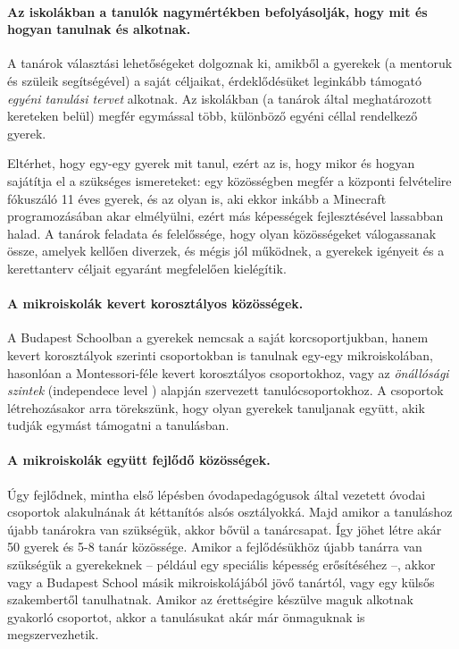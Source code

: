 \paragraph{Az iskolákban a tanulók nagymértékben befolyásolják, hogy mit és
  hogyan tanulnak és alkotnak.}

A tanárok választási lehetőségeket dolgoznak ki, amikből a gyerekek (a
mentoruk és szüleik segítségével) a saját céljaikat, érdeklődésüket
leginkább
támogató \emph{egyéni tanulási tervet} alkotnak. Az iskolákban (a tanárok
által
meghatározott kereteken belül) megfér egymással több, különböző egyéni
céllal
rendelkező gyerek.

Eltérhet, hogy egy-egy gyerek mit tanul, ezért az is, hogy mikor és hogyan
sajátítja el a szükséges ismereteket: egy közösségben megfér a központi
felvételire fókuszáló 11 éves gyerek, és az olyan is, aki ekkor inkább a
Mine\-craft programozásában akar elmélyülni, ezért más képességek
fejlesztésével
lassabban halad. A tanárok feladata és felelőssége, hogy olyan közösségeket
válogassanak össze, amelyek kellően diverzek, és mégis jól működnek, a
gyerekek
igényeit és a kerettanterv céljait egyaránt megfelelően kielégítik.

\paragraph{A mikroiskolák kevert korosztályos közösségek.}

A Budapest Schoolban a gyerekek nemcsak a saját korcsoportjukban, hanem
kevert korosztályok szerinti csoportokban is tanulnak egy-egy mikroiskolában,
hasonlóan a Montessori-féle kevert korosztályos csoportokhoz, vagy az
\emph{önállósági szintek} (independece level  \citep{indepence_level}) alapján
szervezett tanulócsoportokhoz. A csoportok létrehozásakor arra törekszünk, hogy
olyan gyerekek tanuljanak együtt, akik tudják egymást támogatni a tanulásban.

\paragraph{A mikroiskolák együtt fejlődő közösségek.}

Úgy fejlődnek, mintha első lépésben óvodapedagógusok által vezetett óvodai
csoportok
alakulnának át kéttanítós alsós osztályokká. Majd amikor a tanuláshoz újabb
tanárokra van szükségük, akkor bővül a tanárcsapat. Így jöhet létre akár 50
gyerek és 5-8
tanár közössége. Amikor a fejlődésükhöz újabb tanárra van szükségük a
gyerekeknek -- például egy speciális képesség erősítéséhez --, akkor vagy a
Budapest School másik mikroiskolájából jövő tanártól, vagy egy külsős
szakembertől
tanulhatnak. Amikor az érettségire készülve maguk alkotnak gyakorló
csoportot, akkor a tanulásukat akár már önmaguknak is megszervezhetik.

